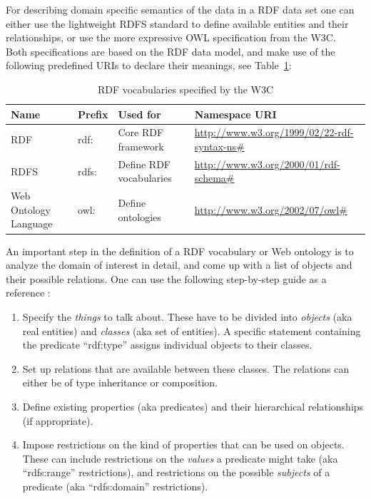 For describing domain specific semantics of the data in a \gls{RDF} data set one can either use the lightweight \gls{RDFS} standard to define available entities and their relationships, or use the more expressive \gls{OWL} specification from the \gls{W3C}. \\

Both specifications are based on the \gls{RDF} data model, and make use of the following predefined \gls{URI}s to declare their meanings, see Table~\ref{tab:w3c_vocab_rdf}: \@

\begin{table}[H]
\centering
\begin{tabular}{p{3cm}llp{4.5cm}}
\hline
\textbf{Name} & \textbf{Prefix} & \textbf{Used for} & \textbf{Namespace URI} \\
\hline
\gls{RDF} & rdf: & Core \gls{RDF} framework & \url{http://www.w3.org/1999/02/22-rdf-syntax-ns\#} \\
\hline
\gls{RDFS} & rdfs: & Define \gls{RDF} vocabularies & \url{http://www.w3.org/2000/01/rdf-schema\#} \\
\hline
Web Ontology Language & owl: & Define ontologies & \url{http://www.w3.org/2002/07/owl\#} \\
\hline
\end{tabular}
\caption[\gls{RDF} vocabularies specified by the \gls{W3C}]{\gls{RDF} vocabularies specified by the \gls{W3C} \citep[pg. 41]{wood2014linked}}
\label{tab:w3c_vocab_rdf}
\end{table}

An important step in the definition of a \gls{RDF} vocabulary or Web ontology is to analyze the domain of interest in detail, and come up with a list of objects and their possible relations. One can use the following step-by-step guide as a reference \citep[pg. 40-55]{antoniou2012semantic}: \@

\begin{enumerate}
	\item Specify the \emph{things} to talk about. These have to be divided into \emph{objects} (aka real entities) and \emph{classes} (aka set of entities). A specific statement containing the predicate ``rdf:type'' assigns individual objects to their classes.
	\item Set up relations that are available between these classes. The relations can either be of type inheritance or composition.
	\item Define existing properties (aka predicates) and their hierarchical relationships (if appropriate).
	\item Impose restrictions on the kind of properties that can be used on objects. These can include restrictions on the \emph{values} a predicate might take (aka ``rdfs:range'' restrictions), and restrictions on the possible \emph{subjects} of a predicate (aka ``rdfs:domain'' restrictions).
\end{enumerate}

